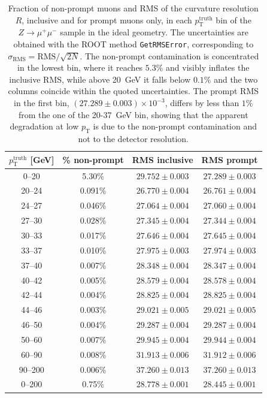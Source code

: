 \documentclass[11pt,a4paper,twoside,openright]{report}
\begin{document}
\begin{table}[htbp]
  \centering
  \begin{tabular*}{\textwidth}{@{\extracolsep{\fill}}cccc}
    \toprule
    $p_{\mathrm{T}}^{\mathrm{truth}}$ [GeV] & \% non-prompt & RMS inclusive & RMS prompt \\
    \midrule
    0--20    & 5.30\%   & $29.752 \pm 0.003$ & $27.289 \pm 0.003$ \\
    20--24   & 0.091\%  & $26.770 \pm 0.004$ & $26.761 \pm 0.004$ \\
    24--27   & 0.046\%  & $27.064 \pm 0.004$ & $27.060 \pm 0.004$ \\
    27--30   & 0.028\%  & $27.345 \pm 0.004$ & $27.344 \pm 0.004$ \\
    30--33   & 0.017\%  & $27.646 \pm 0.004$ & $27.645 \pm 0.004$ \\
    33--37   & 0.010\%  & $27.975 \pm 0.003$ & $27.974 \pm 0.003$ \\
    37--40   & 0.007\%  & $28.348 \pm 0.004$ & $28.347 \pm 0.004$ \\
    40--42   & 0.005\%  & $28.579 \pm 0.004$ & $28.578 \pm 0.004$ \\
    42--44   & 0.004\%  & $28.825 \pm 0.004$ & $28.825 \pm 0.004$ \\
    44--46   & 0.003\%  & $29.021 \pm 0.005$ & $29.021 \pm 0.005$ \\
    46--50   & 0.004\%  & $29.287 \pm 0.004$ & $29.287 \pm 0.004$ \\
    50--60   & 0.007\%  & $29.945 \pm 0.004$ & $29.944 \pm 0.004$ \\
    60--90   & 0.008\%  & $31.913 \pm 0.006$ & $31.912 \pm 0.006$ \\
    90--200  & 0.006\%  & $37.260 \pm 0.013$ & $37.260 \pm 0.013$ \\
    \midrule
    0--200   & 0.75\%   & $28.778 \pm 0.001$ & $28.445 \pm 0.001$ \\
    \bottomrule
  \end{tabular*}
  \caption{Fraction of non-prompt muons and RMS of the curvature resolution $R$, inclusive and for prompt muons only, in each $p_{\mathrm{T}}^{\mathrm{truth}}$ bin of the $Z \to \mu^+\mu^-$ sample in the ideal geometry. The uncertainties are obtained with the ROOT method \texttt{GetRMSError}, corresponding to $\sigma_{\mathrm{RMS}} = \mathrm{RMS}/\sqrt{2N}$. The non-prompt contamination is concentrated in the lowest bin, where it reaches $5.3\%$ and visibly inflates the inclusive RMS, while above 20~GeV it falls below $0.1\%$ and the two columns coincide within the quoted uncertainties. The prompt RMS in the first bin, $(27.289\pm 0.003) \times 10^{-3}$, differs by less than $1\%$ from the one of the 20-37~GeV bin, showing that the apparent degradation at low $p_{\mathrm{T}}$ is due to the non-prompt contamination and not to the detector resolution.}
  \label{tab:nonprompt_fraction}
\end{table}
\end{document}
